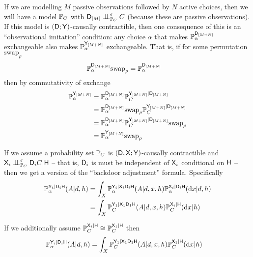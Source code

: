 If we are modelling $M$ passive observations followed by $N$ active choices, then we will have a model $\mathbb{P}_C$ with $\RV{D}_{[M]}\CI_{\prob{P}_C}^e C$ (because these are passive observations). If this model is $(\mathsf{D};\mathsf{Y})$-causally contractible, then one consequence of this is an ``observational imitation'' condition: any choice $\alpha$ that makes $\mathbb{P}_\alpha^{\mathsf{D}_{[M+N]}}$ exchangeable also makes $\mathbb{P}_\alpha^{\mathsf{Y}_{[M+N]}}$ exchangeable. That is, if for some permutation $\mathrm{swap}_\rho$
\begin{align}
    \mathbb{P}_\alpha^{\mathsf{D}_{[M+N]}}\mathrm{swap}_\rho &= \mathbb{P}_\alpha^{\mathsf{D}_{[M+N]}}
\end{align}
then by commutativity of exchange
\begin{align}
    \mathbb{P}_\alpha^{\mathsf{Y}_{[M+N]}} &= \mathbb{P}_\alpha^{\mathsf{D}_{[M+N]}} \mathbb{P}_C^{\mathsf{Y}_{[M+N]}|\mathsf{D}_{[M+N]}}\\
    &=  \mathbb{P}_\alpha^{\mathsf{D}_{[M+N]}}\mathrm{swap}_\rho \mathbb{P}_C^{\mathsf{Y}_{[M+N]}|\mathsf{D}_{[M+N]}}\\
    &= \mathbb{P}_\alpha^{\mathsf{D}_{[M+N]}} \mathbb{P}_C^{\mathsf{Y}_{[M+N]}|\mathsf{D}_{[M+N]}}\mathrm{swap}_\rho\\
    &= \mathbb{P}_\alpha^{\mathsf{Y}_{[M+N]}}\mathrm{swap}_\rho
\end{align}

If we assume a probability set $\mathbb{P}_C$ is $(\mathsf{D},\mathsf{X};\mathsf{Y})$-causally contractible and $\RV{X}_{i}\CI^e_{\prob{P}_C}\RV{D}_{i}C|\RV{H}$ -- that is, $\mathsf{D}_i$ is must be independent of $\mathsf{X}_i$ conditional on $\mathsf{H}$ -- then we get a version of the ``backdoor adjustment'' formula. Specifically
\begin{align}
    \mathbb{P}_\alpha^{\mathsf{Y}_{i}|\mathsf{D}_{i}\mathsf{H}}(A|d,h) &= \int_X \mathbb{P}_\alpha^{\mathsf{Y}_{i}|\mathsf{X}_{i}\mathsf{D}_{i}\mathsf{H}}(A|d,x,h)\mathbb{P}_\alpha^{\mathsf{X}_{i}|\mathsf{D}_{i}\mathsf{H}}(\mathrm{d}x|d,h)\\
    &= \int_X \mathbb{P}_C^{\mathsf{Y}_{1}|\mathsf{X}_{1}\mathsf{D}_{1}\mathsf{H}}(A|d,x,h)\mathbb{P}_C^{\mathsf{X}_{i}|\mathsf{H}}(\mathrm{d}x|h)
\end{align}

If we additionally assume $\mathbb{P}_C^{\mathsf{X}_{i}|\mathsf{H}}\cong \mathbb{P}_C^{\mathsf{X}_{1}|\mathsf{H}}$ then 
\begin{align}
    \mathbb{P}_\alpha^{\mathsf{Y}_{i}|\mathsf{D}_{i}\mathsf{H}}(A|d,h) &= \int_X \mathbb{P}_C^{\mathsf{Y}_{1}|\mathsf{X}_{1}\mathsf{D}_{1}\mathsf{H}}(A|d,x,h)\mathbb{P}_C^{\mathsf{X}_{1}|\mathsf{H}}(\mathrm{d}x|h)\label{eq:backdoor}
\end{align}

